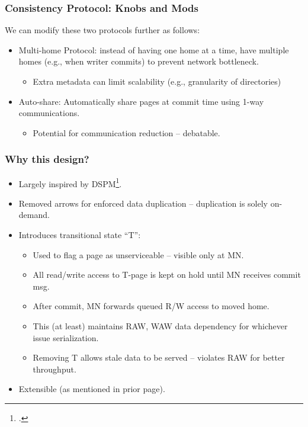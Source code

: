 \documentclass{beamer}
\begin{document}
\begin{frame}
    \frametitle{Consistency Protocol: Knobs and Mods}
    We can modify these two protocols further as follows:
    \begin{itemize}
        \item {
            Multi-home Protocol: instead of having one home at a time, have
            multiple homes (e.g., when writer commits) to prevent network bottleneck.
            \begin{itemize}
                \item Extra metadata can limit scalability (e.g., granularity of directories)
            \end{itemize}
        }
        \item {
            Auto-share: Automatically share pages at commit time using 1-way
            communications.
            \begin{itemize}
                \item Potential for communication reduction -- debatable.
            \end{itemize}
        }
    \end{itemize}
\end{frame}

\begin{frame}
    \frametitle{Why this design?}
    \begin{itemize}
        \item Largely inspired by DSPM\footcite{shan2017distributed}.
        \item Removed arrows for enforced data duplication -- duplication is solely on-demand.
        \item {
            Introduces transitional state ``T'':
            \begin{itemize}
                \item Used to flag a page as unserviceable -- visible only at MN.
                \item All read/write access to T-page is kept on hold until MN receives commit msg.
                \item After commit, MN forwards queued R/W access to moved home.
                \item This (at least) maintains RAW, WAW data dependency for whichever issue serialization.
                \item Removing T allows stale data to be served -- violates RAW for better throughput.
            \end{itemize}
        }
        \item Extensible (as mentioned in prior page).
    \end{itemize}
\end{frame}
\end{document}

